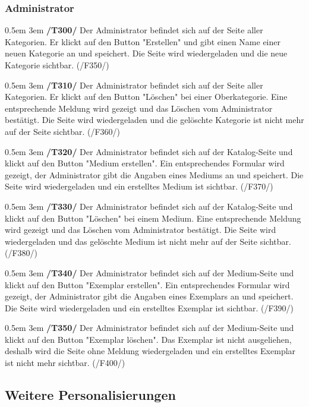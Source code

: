 \documentclass{article}
\newcommand{\specification}[3]{
	{\parindent 0.5em \hangindent 3em \hypertarget{spec:#1:#2}{\textbf{/#1#2/}} #3 \par \nobreak \vspace*{0.5em}}
}
\begin{document}
		\subsubsection{Administrator}
			\specification{T}{300}{Der Administrator befindet sich auf der Seite aller Kategorien. Er klickt auf den Button "Erstellen" und gibt einen Name einer neuen Kategorie an und speichert. 
				Die Seite wird wiedergeladen und die neue Kategorie sichtbar. (/F350/) }
			\specification{T}{310}{Der Administrator befindet sich auf der Seite aller Kategorien. Er klickt auf den Button "Löschen" bei einer Oberkategorie. Eine entsprechende Meldung wird gezeigt und das Löschen vom Administrator bestätigt. 
				Die Seite wird wiedergeladen und die gelöschte Kategorie ist nicht mehr auf der Seite sichtbar. (/F360/) }
			\specification{T}{320}{Der Administrator befindet sich auf der Katalog-Seite und klickt auf den Button "Medium erstellen". Ein entsprechendes Formular wird gezeigt, der Administrator gibt die Angaben eines Mediums an und speichert. 
				Die Seite wird wiedergeladen und ein erstelltes Medium ist sichtbar. (/F370/)}
			\specification{T}{330}{Der Administrator befindet sich auf der Katalog-Seite und klickt auf den Button "Löschen" bei einem Medium. Eine entsprechende Meldung wird gezeigt und das Löschen vom Administrator bestätigt. 
				Die Seite wird wiedergeladen und das gelöschte Medium ist nicht mehr auf der Seite sichtbar. (/F380/) }
			\specification{T}{340}{Der Administrator befindet sich auf der Medium-Seite und klickt auf den Button "Exemplar erstellen". Ein entsprechendes Formular wird gezeigt, der Administrator gibt die Angaben eines Exemplars an und speichert. 
				Die Seite wird wiedergeladen und ein erstelltes Exemplar ist sichtbar. (/F390/)}
			\specification{T}{350}{Der Administrator befindet sich auf der Medium-Seite und klickt auf den Button "Exemplar löschen". 
				Das Exemplar ist nicht ausgeliehen, deshalb wird die Seite ohne Meldung wiedergeladen und ein erstelltes Exemplar ist nicht mehr sichtbar. (/F400/)}
	\subsection{Weitere Personalisierungen}
\end{document}
